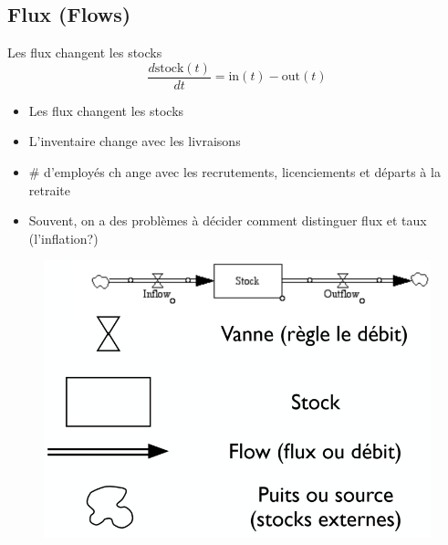 \documentclass[resume]{subfiles}
\begin{document}
\subsection{Flux (Flows)}
Les flux changent les stocks
$$\frac{d\text{stock}(t)}{dt}=\text{in}(t)-\text{out}(t)$$
\begin{itemize}
\item Les flux changent les stocks
  \item L'inventaire change avec les livraisons
  \item \# d'employés ch ange avec les recrutements, licenciements et départs à la retraite
\item Souvent, on a des problèmes à décider comment
  distinguer flux et taux (l'inflation?)  
\end{itemize}
\begin{figure}[H]
    \centering
    \includegraphics[width=\columnwidth]{Figures/StockFlow.PNG}
\end{figure}
\end{document}
